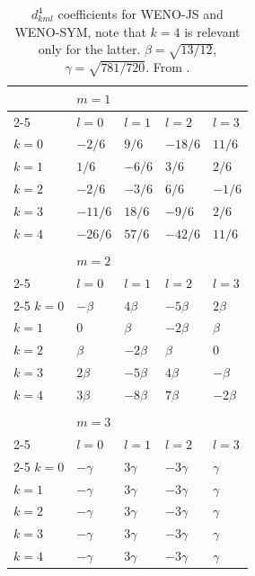 \begin{table}
\begin{center}
\begin{tabular*}{\textwidth}{@{\extracolsep{\fill}}lllll}
  \hline
            & $m = 1$                                             \\
            \cline{2-5}
            & $l = 0$    & $l = 1$     & $l = 2$      & $l = 3$   \\
  \hline
    $k = 0$ & $-2/6$     & $9/6$       & $-18/6$      & $11/6$    \\
    $k = 1$ & $1/6$      & $-6/6$      & $3/6$        & $2/6$     \\
    $k = 2$ & $-2/6$     & $-3/6$      & $6/6$        & $-1/6$    \\
    $k = 3$ & $-11/6$    & $18/6$      & $-9/6$       & $2/6$     \\
    $k = 4$ & $-26/6$    & $57/6$      & $-42/6$      & $11/6$    \\
                                                                  \\
            & $m = 2$                                             \\
            \cline{2-5}
            & $l = 0$    & $l = 1$     & $l = 2$      & $l = 3$   \\
            \cline{2-5}
    $k = 0$ & $-\beta$   & $4\beta$    & $-5\beta$    & $2\beta$  \\
    $k = 1$ & $0$        & $\beta$     & $-2\beta$    & $\beta$   \\
    $k = 2$ & $\beta$    & $-2\beta$   & $\beta$      & $0$       \\
    $k = 3$ & $2\beta$   & $-5\beta$   & $4\beta$     & $-\beta$  \\
    $k = 4$ & $3\beta$   & $-8\beta$   & $7\beta$     & $-2\beta$ \\
                                                                  \\
            & $m = 3$                                             \\
            \cline{2-5}
            & $l = 0$    & $l = 1$     & $l = 2$      & $l = 3$   \\
            \cline{2-5}
    $k = 0$ & $-\gamma$  & $3\gamma$   & $-3\gamma$   & $\gamma$  \\
    $k = 1$ & $-\gamma$  & $3\gamma$   & $-3\gamma$   & $\gamma$  \\
    $k = 2$ & $-\gamma$  & $3\gamma$   & $-3\gamma$   & $\gamma$  \\
    $k = 3$ & $-\gamma$  & $3\gamma$   & $-3\gamma$   & $\gamma$  \\
    $k = 4$ & $-\gamma$  & $3\gamma$   & $-3\gamma$   & $\gamma$  \\
  \hline
\end{tabular*}
\end{center}
\caption{
  $d^4_{kml}$ coefficients for WENO-JS and WENO-SYM, note that $k = 4$ is
  relevant only for the latter. $\beta = \sqrt{13/12}$, $\gamma =
  \sqrt{781/720}$. From \cite{martin}.
}
\end{table}

